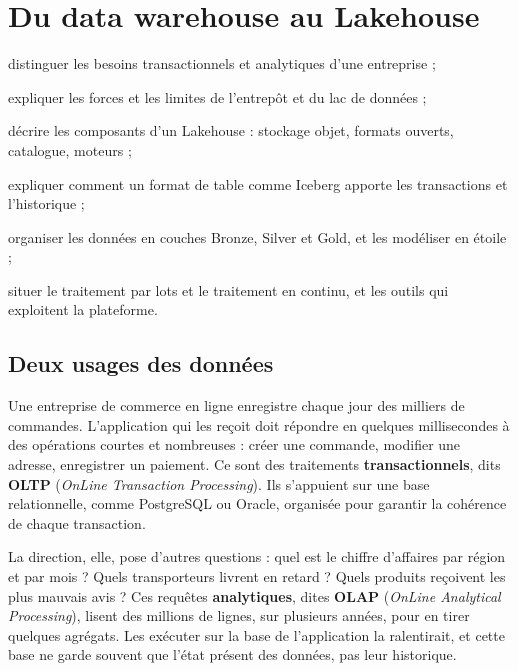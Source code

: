 \chapter{Du data warehouse au Lakehouse}\label{ch:fondements}

\begin{objectifs}
  \item distinguer les besoins transactionnels et analytiques d'une entreprise ;
  \item expliquer les forces et les limites de l'entrepôt et du lac de données ;
  \item décrire les composants d'un Lakehouse : stockage objet, formats ouverts, catalogue, moteurs ;
  \item expliquer comment un format de table comme Iceberg apporte les transactions et l'historique ;
  \item organiser les données en couches Bronze, Silver et Gold, et les modéliser en étoile ;
  \item situer le traitement par lots et le traitement en continu, et les outils qui exploitent la plateforme.
\end{objectifs}

\section{Deux usages des données}

Une entreprise de commerce en ligne enregistre chaque jour des milliers de commandes. L'application
qui les reçoit doit répondre en quelques millisecondes à des opérations courtes et nombreuses :
créer une commande, modifier une adresse, enregistrer un paiement. Ce sont des traitements
\textbf{transactionnels}, dits \textbf{OLTP} (\emph{OnLine Transaction Processing}). Ils
s'appuient sur une base relationnelle, comme PostgreSQL ou Oracle, organisée pour garantir la
cohérence de chaque transaction.

La direction, elle, pose d'autres questions : quel est le chiffre d'affaires par région et par
mois ? Quels transporteurs livrent en retard ? Quels produits reçoivent les plus mauvais avis ?
Ces requêtes \textbf{analytiques}, dites \textbf{OLAP} (\emph{OnLine Analytical
Processing}), lisent des millions de lignes, sur plusieurs années, pour en tirer quelques
agrégats. Les exécuter sur la base de l'application la ralentirait, et cette base ne garde souvent
que l'état présent des données, pas leur historique.

